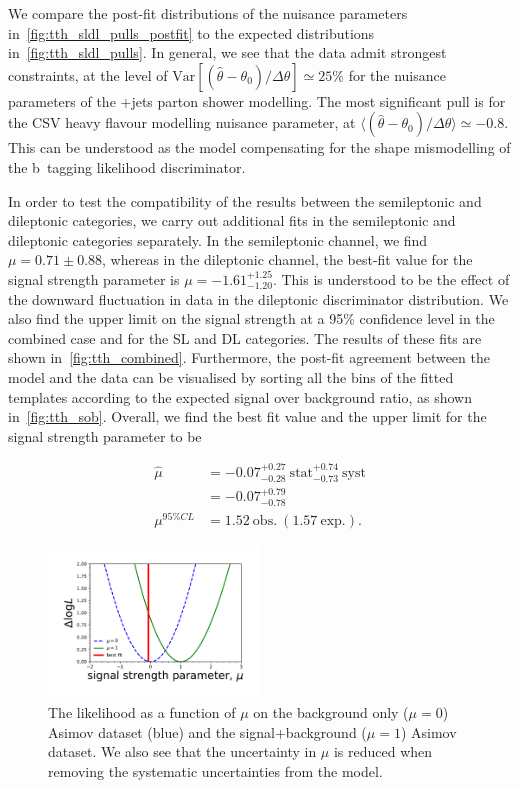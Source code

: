 We compare the post-fit distributions of the nuisance parameters in~\cref{fig:tth_sldl_pulls_postfit} to the expected distributions in~\cref{fig:tth_sldl_pulls}. In general, we see that the data admit strongest constraints, at the level of $\mathrm{Var}[(\hat{\theta} - \theta_0)/\Delta \theta] \simeq 25\%$ for the nuisance parameters of the \ttbar+jets parton shower modelling. The most significant pull is for the CSV heavy flavour modelling nuisance parameter, at $\langle (\hat{\theta} - \theta_0)/\Delta \theta \rangle \simeq -0.8$. This can be understood as the model compensating for the shape mismodelling of the b~tagging likelihood discriminator.

In order to test the compatibility of the results between the semileptonic and dileptonic categories, we carry out additional fits in the semileptonic and dileptonic categories separately. In the semileptonic channel, we find $\mu = 0.71\pm 0.88$, whereas in the dileptonic channel, the best-fit value for the signal strength parameter is $\mu = -1.61^{+1.25}_{-1.20}$. This is understood to be the effect of the downward fluctuation in data in the dileptonic discriminator distribution. We also find the upper limit on the signal strength at a 95\% confidence level in the combined case and for the SL and DL categories. The results of these fits are shown in~\cref{fig:tth_combined}. Furthermore, the post-fit agreement between the model and the data can be visualised by sorting all the bins of the fitted templates according to the expected signal over background ratio, as shown in~\cref{fig:tth_sob}. Overall, we find the best fit value and the upper limit for the signal strength parameter to be

\begin{align}
\label{eq:tth_bestfit}
\hat{\mu} &= -0.07  ^{+0.27}_{-0.28}~\mathrm{stat} ^{+0.74}_{-0.73}~\mathrm{syst} \\
&= -0.07^{+0.79}_{-0.78}\\
\mu^{95\%CL} &= 1.52~\mathrm{obs.}~(1.57~\mathrm{exp.}).
\end{align}

\begin{figure}
\begin{centering}
\includegraphics[width = 0.5\textwidth]{figures/tth/r_scan.pdf}
\caption[The likelihood with respect to the minimum as a function of $\mu$]{The likelihood as a function of $\mu$ on the background only ($\mu=0$) Asimov dataset (blue) and the signal+background ($\mu=1$) Asimov dataset. We also see that the uncertainty in $\mu$ is reduced when removing the systematic uncertainties from the model.}
\label{fig:tth_likelihood}
\end{centering}
\end{figure}

